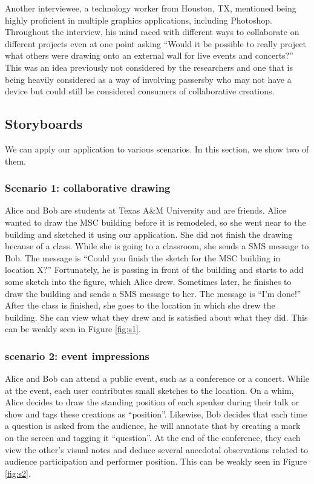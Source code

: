 \documentclass{chi2009}
\begin{document}
Another interviewee, a technology worker from Houston, TX, mentioned being
highly proficient in multiple graphics applications, including Photoshop.
Throughout the interview, his mind raced with different ways to collaborate on
different projects even at one point asking ``Would it be possible to really
project what others were drawing onto an external wall for live events and
concerts?''  This was an idea previously not considered by the researchers and
one that is being heavily considered as a way of involving passersby who may
not have a device but could still be considered consumers of collaborative
creations.

\subsection{Storyboards}
We can apply our application to various scenarios. In this section, we show two
of them.

\subsubsection{Scenario 1: collaborative drawing}

Alice and Bob are students at Texas A\&M University and are friends. Alice
wanted to draw the MSC building before it is remodeled, so she went near to the
building and sketched it using our application. She did not finish the drawing
because of a class. While she is going to a classroom, she sends a SMS message
to Bob. The message is ``Could you finish the sketch for the MSC building in
location X?'' Fortunately, he is passing in front of the building and starts to
add some sketch into the figure, which Alice drew. Sometimes later, he finishes
to draw the building and sends a SMS message to her. The message is ``I'm
done!'' After the class is finished, she goes to the location in which she drew
the building. She can view what they drew and is satisfied about what they did.
This can be weakly seen in Figure \ref{fig:s1}.

\subsubsection{scenario 2: event impressions}

Alice and Bob can attend a public event, such as a conference or a concert.
While at the event, each user contributes small sketches to the location.  On a
whim, Alice decides to draw the standing position of each speaker during their
talk or show and tags these creations as ``position''.  Likewise, Bob decides
that each time a question is asked from the audience, he will annotate that by
creating a mark on the screen and tagging it ``question''.  At the end of the
conference, they each view the other's visual notes and deduce several
anecdotal observations related to audience participation and performer
position.  This can be weakly seen in Figure \ref{fig:s2}.
\end{document}
